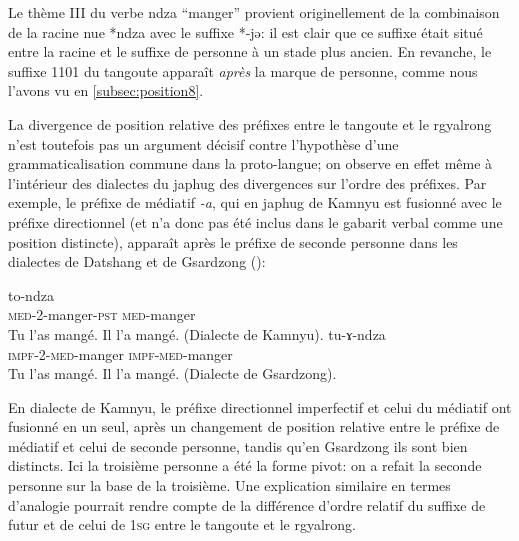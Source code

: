\documentclass[oldfontcommands,twoside,a4paper,11pt,draft]{memoir}
\newcommand{\ipa}[1]{{\phon #1}} %
\newcommand{\tgz}[1]{#1 \mo{#1} \tg{#1}}
\newcommand{\impf}{\textsc{impf}}
\newcommand{\med}{\textsc{med}}
\newcommand{\sg}{\textsc{sg}}
\begin{document}
Le thème III du verbe \ipa{ndza} ``manger'' provient originellement de la combinaison de la racine nue *ndza avec le suffixe *-jə: il est clair que ce suffixe était situé entre la racine et le suffixe de personne à un stade plus ancien. En revanche, le suffixe  \tgz{1101} du tangoute apparaît \textit{après} la marque de personne, comme nous l'avons vu en \ref{subsec:position8}. 

La divergence de position relative des préfixes entre  le tangoute et le rgyalrong n'est toutefois pas un argument décisif contre l'hypothèse d'une grammaticalisation commune dans la proto-langue; on observe en effet même à l'intérieur des dialectes du japhug des divergences sur l'ordre des préfixes. Par exemple, le préfixe de médiatif \textit{-a}, qui en japhug de Kamnyu est fusionné avec le préfixe directionnel (et n'a donc pas été inclus dans le gabarit verbal comme une position distincte), apparaît après le préfixe de seconde personne dans les dialectes de Datshang et de Gsardzong (\citealt[249]{jacques08}):

\begin{exe}
\ex 
\gll \ipa{to-tɯ-ndza-t} \ipa{to-ndza} \\
  \med{}-2-manger-\textsc{pst}    \med{}-manger \\
\glt  Tu l'as mangé. Il l'a mangé. (Dialecte de Kamnyu).
\ex 
\gll \ipa{tu-tɯ-ɤ-ndza} \ipa{tu-ɤ-ndza} \\
  \impf{}-2-\med{}-manger \impf{}-\med{}-manger \\
\glt  Tu l'as mangé. Il l'a mangé. (Dialecte de Gsardzong).
\end{exe}

 En dialecte de Kamnyu, le  préfixe directionnel imperfectif et celui du médiatif ont fusionné en un seul, après un changement de position relative entre le préfixe de médiatif et celui de seconde personne, tandis qu'en Gsardzong ils sont bien distincts. Ici la troisième personne a été la forme pivot: on a refait la seconde personne sur la base de la troisième. Une explication similaire en termes d'analogie pourrait rendre compte de la différence d'ordre relatif du suffixe de futur et de celui de 1\sg{} entre le tangoute et le rgyalrong.
 
\end{document}
